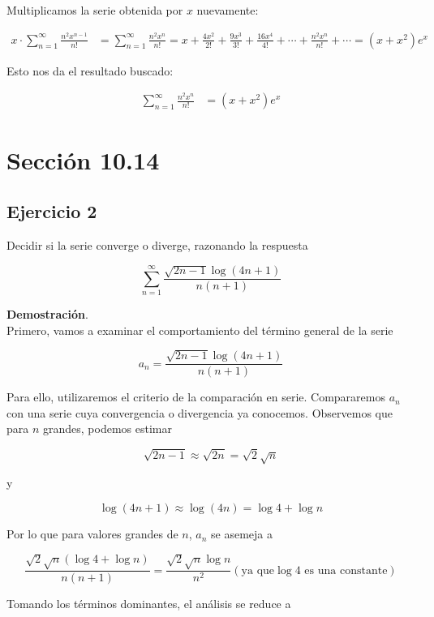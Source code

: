 \documentclass{article}
\begin{document}
    Multiplicamos la serie obtenida por \( x \) nuevamente:

    \begin{align*}
    x \cdot \sum_{n=1}^{\infty} \frac{n^{2} x^{n-1}}{n!} &= \sum_{n=1}^{\infty} \frac{n^{2} x^{n}}{n!} = x + \frac{4 x^{2}}{2!} + \frac{9 x^{3}}{3!} + \frac{16 x^{4}}{4!} + \cdots + \frac{n^{2} x^{n}}{n!} + \cdots = (x + x^{2}) e^{x}
    \end{align*}

    Esto nos da el resultado buscado:

    \begin{align*}
    \sum_{n=1}^{\infty} \frac{n^{2} x^{n}}{n!} &= (x + x^{2}) e^{x}
    \end{align*}
    \section*{Sección 10.14}
    \subsection*{Ejercicio 2}

    Decidir si la serie converge o diverge, razonando la respuesta

    $$
    \sum_{n=1}^{\infty} \frac{\sqrt{2 n-1} \log (4 n+1)}{n(n+1)}
    $$

    \textbf{Demostración}.\\

    Primero, vamos a examinar el comportamiento del término general de la serie

    \[
    a_n = \frac{\sqrt{2 n-1} \log (4 n+1)}{n(n+1)}
    \]

    Para ello, utilizaremos el criterio de la comparación en serie. Compararemos $a_n$ con una serie cuya convergencia o divergencia ya conocemos. Observemos que para $n$ grandes, podemos estimar

    \[
    \sqrt{2n-1} \approx \sqrt{2n} = \sqrt{2}\sqrt{n}
    \]

    y

    \[
    \log(4n+1) \approx \log(4n) = \log 4 + \log n
    \]

    Por lo que para valores grandes de $n$, $a_n$ se asemeja a

    \[
    \frac{\sqrt{2} \sqrt{n} (\log 4 + \log n)}{n(n+1)} = \frac{\sqrt{2} \sqrt{n} \log n}{n^2} \left( \text{ya que} \log 4 \text{ es una constante}\right)
    \]

    Tomando los términos dominantes, el análisis se reduce a
\end{document}
